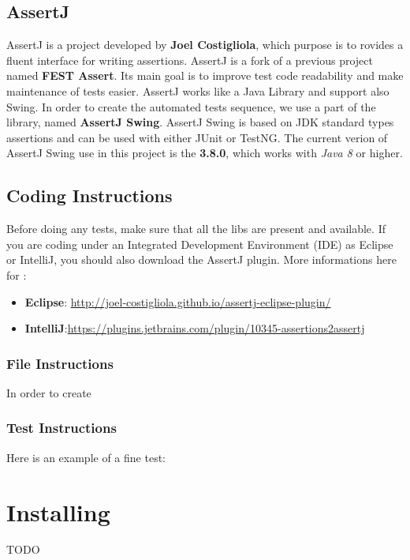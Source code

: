 \documentclass[12pt]{article}
\begin{document}
\subsection{AssertJ}
AssertJ is a project developed by \textbf{Joel Costigliola}, which purpose is to rovides a fluent interface for writing assertions. 
AssertJ is a fork of a previous project named \textbf{FEST Assert}. Its main goal is to improve test code readability and make maintenance of tests easier.
AssertJ works like a Java Library and support also Swing.\newline
In order to create the automated tests sequence, we use a part of the library, named \textbf{AssertJ Swing}.
AssertJ Swing is based on JDK standard types assertions and can be used with either JUnit or TestNG. \newline
The current verion of AssertJ Swing use in this project is the \textbf{3.8.0}, which works with \textit{Java 8} or higher.

\newpage

\subsection{Coding Instructions}
Before doing any tests, make sure that all the libs are present and available. \newline
If you are coding under an Integrated Development Environment (IDE) as Eclipse or IntelliJ, you should also download the AssertJ plugin. More informations here for :

\begin{itemize}
   \item \textbf{Eclipse}: \url{http://joel-costigliola.github.io/assertj-eclipse-plugin/}
   \item \textbf{IntelliJ}:\url{https://plugins.jetbrains.com/plugin/10345-assertions2assertj}
\end{itemize}

\subsubsection{File Instructions}
In order to create

\subsubsection{Test Instructions}
Here is an example of a fine test:

\newpage 

\section{Installing}
TODO
\end{document}
